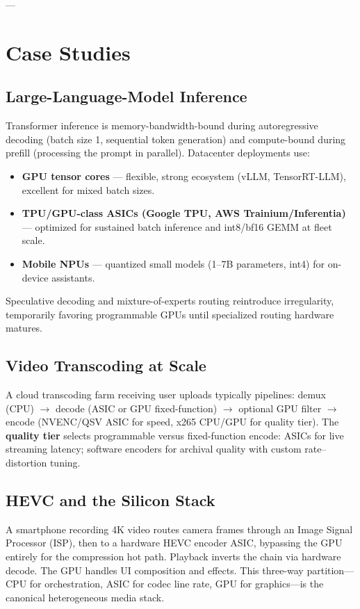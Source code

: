 \documentclass[11pt,journal,onecolumn]{IEEEtran}
\begin{document}
---

\section{Case Studies}

\subsection{Large-Language-Model Inference}
Transformer inference is memory-bandwidth-bound during autoregressive decoding (batch size 1, sequential token generation) and compute-bound during prefill (processing the prompt in parallel). Datacenter deployments use:
\begin{itemize}
    \item \textbf{GPU tensor cores} --- flexible, strong ecosystem (vLLM, TensorRT-LLM), excellent for mixed batch sizes.
    \item \textbf{TPU/GPU-class ASICs (Google TPU, AWS Trainium/Inferentia)} --- optimized for sustained batch inference and int8/bf16 GEMM at fleet scale.
    \item \textbf{Mobile NPUs} --- quantized small models (1--7B parameters, int4) for on-device assistants.
\end{itemize}
Speculative decoding and mixture-of-experts routing reintroduce irregularity, temporarily favoring programmable GPUs until specialized routing hardware matures.

\subsection{Video Transcoding at Scale}
A cloud transcoding farm receiving user uploads typically pipelines: demux (CPU) $\rightarrow$ decode (ASIC or GPU fixed-function) $\rightarrow$ optional GPU filter $\rightarrow$ encode (NVENC/QSV ASIC for speed, x265 CPU/GPU for quality tier). The \textbf{quality tier} selects programmable versus fixed-function encode: ASICs for live streaming latency; software encoders for archival quality with custom rate--distortion tuning.

\subsection{HEVC and the Silicon Stack}
A smartphone recording 4K video routes camera frames through an Image Signal Processor (ISP), then to a hardware HEVC encoder ASIC, bypassing the GPU entirely for the compression hot path. Playback inverts the chain via hardware decode. The GPU handles UI composition and effects. This three-way partition---CPU for orchestration, ASIC for codec line rate, GPU for graphics---is the canonical heterogeneous media stack.
\end{document}
